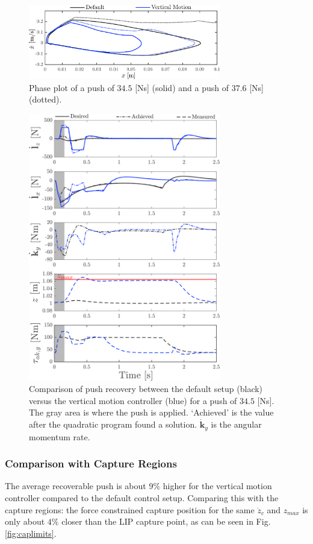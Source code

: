\documentclass[letterpaper, 10 pt, conference]{ieeeconf}  %
\newcommand{\zmax}{z_{max}}
\begin{document}
\begin{figure}
      \centering
      \includegraphics[width=3.3in]{valcomparephase.png}
      \caption{Phase plot of a push of $34.5$ [Ns] (solid) and a push of $37.6$ [Ns] (dotted).}
      \label{fig:valcomparephase}
\end{figure}
\begin{figure}
      \centering
      \includegraphics[width=3.3in]{valcomparetime.png}
      \caption{Comparison of push recovery between the default setup (black) versus the vertical motion controller (blue) for a push of $34.5$ [Ns]. The gray area is where the push is applied. `Achieved' is the value after the quadratic program found a solution. $\dot{\mathbf{k}}_y$ is the angular momentum rate.}
      \label{fig:valcompare}
\end{figure}
\subsubsection{Comparison with Capture Regions}
The average recoverable push is about $9\%$ higher for the vertical motion controller compared to the default control setup. Comparing this with the capture regions: the force constrained capture position for the same $\ddot{z}_c$ and $\zmax$ is only about $4\%$ closer than the LIP capture point, as can be seen in Fig. \ref{fig:caplimits}.  
\end{document}
